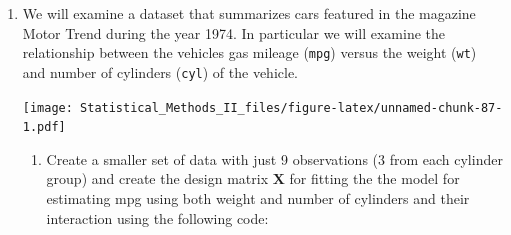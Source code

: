 \documentclass[]{book}
\newenvironment{Shaded}{\begin{snugshade}}{\end{snugshade}}
\newcommand{\KeywordTok}[1]{\textcolor[rgb]{0.13,0.29,0.53}{\textbf{{#1}}}}
\newcommand{\DataTypeTok}[1]{\textcolor[rgb]{0.13,0.29,0.53}{{#1}}}
\newcommand{\DecValTok}[1]{\textcolor[rgb]{0.00,0.00,0.81}{{#1}}}
\newcommand{\StringTok}[1]{\textcolor[rgb]{0.31,0.60,0.02}{{#1}}}
\newcommand{\CommentTok}[1]{\textcolor[rgb]{0.56,0.35,0.01}{\textit{{#1}}}}
\newcommand{\NormalTok}[1]{{#1}}
\theoremstyle{definition}
\theoremstyle{definition}
\theoremstyle{remark}
\begin{document}
\begin{enumerate}
\def\labelenumi{\arabic{enumi}.}
\item
  We will examine a dataset that summarizes cars featured in the
  magazine Motor Trend during the year 1974. In particular we will
  examine the relationship between the vehicles gas mileage
  (\texttt{mpg}) versus the weight (\texttt{wt}) and number of cylinders
  (\texttt{cyl}) of the vehicle.

\begin{Shaded}
\end{Shaded}

  \texttt{[image: Statistical\_Methods\_II\_files/figure-latex/unnamed-chunk-87-1.pdf]}

  \begin{enumerate}
  \def\labelenumii{\alph{enumii}.}
  \item
    Create a smaller set of data with just 9 observations (3 from each
    cylinder group) and create the design matrix \(\boldsymbol{X}\) for
    fitting the the model for estimating mpg using both weight and
    number of cylinders and their interaction using the following code:

\begin{Shaded}
\end{Shaded}


\end{enumerate}
\end{enumerate}
\end{document}
